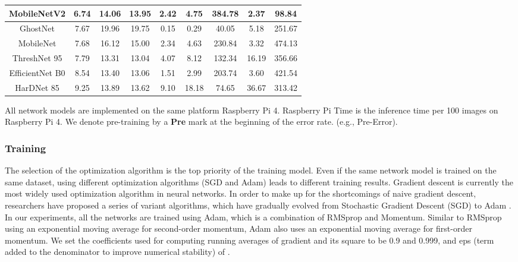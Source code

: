 \documentclass[default,iicol]{sn-jnl}
\theoremstyle{thmstyleone}\newtheorem{theorem}{Theorem}\newtheorem{proposition}[theorem]{Proposition}
\theoremstyle{thmstyletwo}\newtheorem{example}{Example}\newtheorem{remark}{Remark}
\theoremstyle{thmstylethree}\newtheorem{definition}{Definition}
\begin{document}
\begin{table*}[]
{\begin{tabular}{|c|c|c|c|c|c|c|c|c|}
MobileNetV2 \cite{sandler2018mobilenetv2} & 6.74 & 14.06 & 13.95 & 2.42 & 4.75 & 384.78 & 2.37 & 98.84 \\ \hline
GhostNet \cite{han2020ghostnet} & 7.67 & 19.96 & 19.75 & 0.15 & 0.29 & 40.05 & 5.18 & 251.67 \\ \hline
MobileNet \cite{howard2017mobilenets} & 7.68 & 16.12 & 15.00 & 2.34 & 4.63 & 230.84 & 3.32 & 474.13 \\ \hline
ThreshNet 95 \cite{ju2022threshnet} & 7.79 & 13.31 & 13.04 & 4.07 & 8.12 & 132.34 & 16.19 & 356.66 \\ \hline
EfficientNet B0 \cite{tan2019efficientnet} & 8.54 & 13.40 & 13.06 & 1.51 & 2.99 & 203.74 & 3.60 & 421.54 \\ \hline
HarDNet 85 \cite{chao2019hardnet} & 9.25 & 13.89 & 13.62 & 9.10 & 18.18 & 74.65 & 36.67 & 313.42 \\ \hline
\end{tabular}
}
\vspace{1mm}
\begin{tablenotes}
All network models are implemented on the same platform Raspberry Pi 4. Raspberry Pi Time is the inference time per 100 images on Raspberry Pi 4. We denote pre-training by a \textbf{Pre} mark at the beginning of the error rate. (e.g., Pre-Error).
\end{tablenotes}
\end{table*}

\subsubsection{Training}
The selection of the optimization algorithm is the top priority of the training model. Even if the same network model is trained on the same dataset, using different optimization algorithms (SGD and Adam) leads to different training results. Gradient descent is currently the most widely used optimization algorithm in neural networks. In order to make up for the shortcomings of naive gradient descent, researchers have proposed a series of variant algorithms, which have gradually evolved from Stochastic Gradient Descent (SGD) to Adam \cite{kingma2014adam}. In our experiments, all the networks are trained using Adam, which is a combination of RMSprop and Momentum. Similar to RMSprop using an exponential moving average for second-order momentum, Adam also uses an exponential moving average for first-order momentum. We set the coefficients used for computing running averages of gradient and its square to be 0.9 and 0.999, and eps (term added to the denominator to improve numerical stability) of . 
\end{document}
